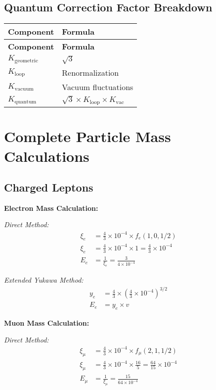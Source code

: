 \documentclass[12pt,a4paper]{article}
\begin{document}
	\subsection{Quantum Correction Factor Breakdown}
	
	\begin{longtable}{|p{3cm}|p{4cm}|}
		\hline
		\textbf{Component} & \textbf{Formula} \\
		\hline
		\endfirsthead
		\hline
		\textbf{Component} & \textbf{Formula} \\
		\hline
		\endhead
		\(K_{\text{geometric}}\) & \(\sqrt{3}\) \\
		\hline
		\(K_{\text{loop}}\) & Renormalization \\
		\hline
		\(K_{\text{vacuum}}\) & Vacuum fluctuations \\
		\hline
		\(K_{\text{quantum}}\) & \(\sqrt{3} \times K_{\text{loop}} \times K_{\text{vac}}\) \\
		\hline
	\end{longtable}
	
	\section{Complete Particle Mass Calculations}
	
	\subsection{Charged Leptons}
	
	\textbf{Electron Mass Calculation:}
	
	\textit{Direct Method:}
	\begin{align}
		\xi_e &= \frac{4}{3} \times 10^{-4} \times f_e(1,0,1/2) \\
		\xi_e &= \frac{4}{3} \times 10^{-4} \times 1 = \frac{4}{3} \times 10^{-4} \\
		E_{e} &= \frac{1}{\xi_e} = \frac{3}{4 \times 10^{-4}}
	\end{align}
	
	\textit{Extended Yukawa Method:}
	\begin{align}
		y_e &= \frac{4}{3} \times \left(\frac{4}{3} \times 10^{-4}\right)^{3/2} \\
		E_e &= y_e \times v
	\end{align}
	
	\textbf{Muon Mass Calculation:}
	
	\textit{Direct Method:}
	\begin{align}
		\xi_\mu &= \frac{4}{3} \times 10^{-4} \times f_\mu(2,1,1/2) \\
		\xi_\mu &= \frac{4}{3} \times 10^{-4} \times \frac{16}{5} = \frac{64}{15} \times 10^{-4} \\
		E_{\mu} &= \frac{1}{\xi_\mu} = \frac{15}{64 \times 10^{-4}}
	\end{align}
	
\end{document}
